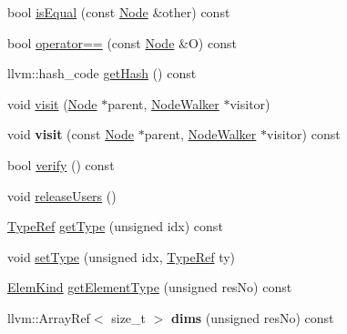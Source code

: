 \begin{DoxyCompactItemize}
\item 
bool \hyperlink{classglow_1_1_node_aafeb437c040985884ff29c1ccd7946a5}{is\+Equal} (const \hyperlink{classglow_1_1_node}{Node} \&other) const
\item 
bool \hyperlink{classglow_1_1_node_ad4f15015ad48947f9e6d329e94f4a29d}{operator==} (const \hyperlink{classglow_1_1_node}{Node} \&O) const
\item 
llvm\+::hash\+\_\+code \hyperlink{classglow_1_1_node_a64701a874397cb291e62b74d782f8729}{get\+Hash} () const
\item 
void \hyperlink{classglow_1_1_node_a3cf56aeb0f2601d389efd276691ba0cc}{visit} (\hyperlink{classglow_1_1_node}{Node} $\ast$parent, \hyperlink{classglow_1_1_node_walker}{Node\+Walker} $\ast$visitor)
\item 
\mbox{\label{classglow_1_1_node_acc090e9f629b4a63a5b7a68173f21ecd}} 
void {\bfseries visit} (const \hyperlink{classglow_1_1_node}{Node} $\ast$parent, \hyperlink{classglow_1_1_node_walker}{Node\+Walker} $\ast$visitor) const
\item 
bool \hyperlink{classglow_1_1_node_a68444a674fcec690542184620c62f3f9}{verify} () const
\item 
void \hyperlink{classglow_1_1_node_a3f0e43cd641d23ef79cbed7977406956}{release\+Users} ()
\item 
\hyperlink{structglow_1_1_type}{Type\+Ref} \hyperlink{classglow_1_1_node_a5fbfc4b0def2722bb3b8a18499111d69}{get\+Type} (unsigned idx) const
\item 
void \hyperlink{classglow_1_1_node_a6dc4d836519ee24333cf01500ba76a00}{set\+Type} (unsigned idx, \hyperlink{structglow_1_1_type}{Type\+Ref} ty)
\end{DoxyCompactItemize}
\textbf{ }\par
\begin{DoxyCompactItemize}
\item 
\hyperlink{namespaceglow_ab92e14a94329daf4083db670e95fbcdf}{Elem\+Kind} \hyperlink{classglow_1_1_node_ac8ff415675b1bdffe7ed357d87932023}{get\+Element\+Type} (unsigned res\+No) const
\item 
\mbox{\label{classglow_1_1_node_ad9bf0a7be9caaf273e176f2f97eb9c7f}} 
llvm\+::\+Array\+Ref$<$ size\+\_\+t $>$ {\bfseries dims} (unsigned res\+No) const
\end{DoxyCompactItemize}

